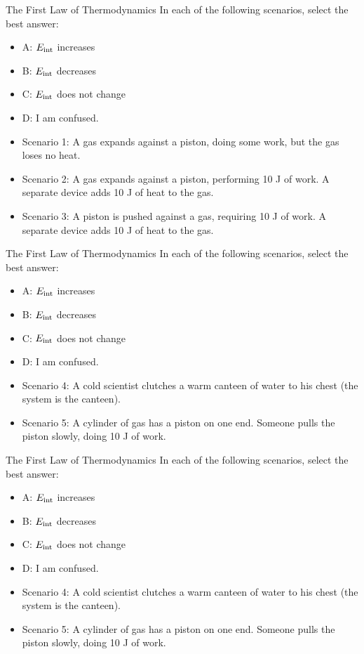 \documentclass{beamer}
\begin{document}
\begin{frame}{The First Law of Thermodynamics}
In each of the following scenarios, select the best answer:
\small
\begin{itemize}
\item A: $E_{\rm int}$ increases
\item B: $E_{\rm int}$ decreases
\item C: $E_{\rm int}$ does not change
\item D: I am confused.
\end{itemize}
\small
\begin{itemize}
\item Scenario 1: A gas expands against a piston, doing some work, but the gas loses no heat.
\item Scenario 2: A gas expands against a piston, performing 10 J of work.  A separate device adds 10 J of heat to the gas.
\item Scenario 3: \alert{A piston is pushed against a gas, requiring 10 J of work.  A separate device adds 10 J of heat to the gas.}
\end{itemize}
\end{frame}

\begin{frame}{The First Law of Thermodynamics}
In each of the following scenarios, select the best answer:
\small
\begin{itemize}
\item A: $E_{\rm int}$ increases
\item B: $E_{\rm int}$ decreases
\item C: $E_{\rm int}$ does not change
\item D: I am confused.
\end{itemize}
\small
\begin{itemize}
\item Scenario 4: \alert{A cold scientist clutches a warm canteen of water to his chest (the system is the canteen).}
\item Scenario 5: A cylinder of gas has a piston on one end.  Someone pulls the piston slowly, doing 10 J of work.
\end{itemize}
\end{frame}

\begin{frame}{The First Law of Thermodynamics}
In each of the following scenarios, select the best answer:
\small
\begin{itemize}
\item A: $E_{\rm int}$ increases
\item B: $E_{\rm int}$ decreases
\item C: $E_{\rm int}$ does not change
\item D: I am confused.
\end{itemize}
\small
\begin{itemize}
\item Scenario 4: A cold scientist clutches a warm canteen of water to his chest (the system is the canteen).
\item Scenario 5: \alert{A cylinder of gas has a piston on one end.  Someone pulls the piston slowly, doing 10 J of work.}
\end{itemize}
\end{frame}
\end{document}
